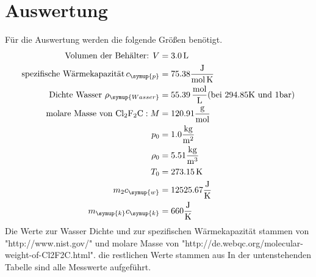 \section{Auswertung}
\label{sec:Auswertung}
Für die Auswertung werden die folgende Größen benötigt.
\begin{align*}
  \text{Volumen der Behälter: } V &= 3.0 \,\si{\liter} \\
  \text{spezifische Wärmekapazität}\, c_\symup{p} &= 75.38\si{\frac{\joule}{\mol\,\kelvin}}  \\
  \text{Dichte Wasser } \rho_\symup{Wasser} &= 55.39 \,\si{\frac{\mol}{\liter}}
        (\text{bei } 294.85 \si{\kelvin} \text{ und } 1\si{\bar}) \\
  \text{molare Masse von } \ce{Cl2F2C}: M &= 120.91 \si{\frac{\gram}{\mol}} \\
  p_0 &= 1.0 \si{\frac{\kilo\gram}{\meter^2}}  \\
  \rho_0 &= 5.51  \si{\frac{\kilo\gram}{\meter^3}} \\
  T_0 &= 273.15 \,  \si{\kelvin}  \\
  m_2c_\symup{w} &= 12525.67 \si{\frac{\joule}{\kelvin}} \\
  m_\symup{k}c_\symup{k} &= 660   \si{\frac{\joule}{\kelvin}}
\end{align*}
Die Werte zur Wasser Dichte und zur spezifischen Wärmekapazität stammen von
"http://www.nist.gov/" und molare Masse von "http://de.webqc.org/molecular-weight-of-Cl2F2C.html".
die restlichen Werte stammen aus \cite{sample}
In der untenstehenden Tabelle sind alle Messwerte aufgeführt.
